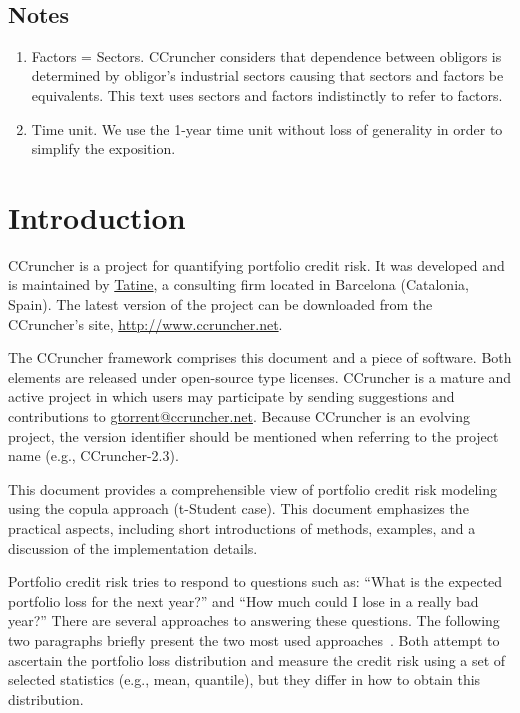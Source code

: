 \documentclass[11pt,fleqn]{book} %
\def\numversion{2.3}
\begin{document}
\glsaddall
\printglossary[style=super3colleft]
~\vfill
\section*{Notes}
\begin{enumerate}[leftmargin=*]
	\itemsep 0.5em
	\item Factors = Sectors. CCruncher considers that dependence between 
	obligors is determined by obligor's industrial sectors causing that 
	sectors and factors be equivalents. This text uses sectors and factors 
	indistinctly to refer to factors.
	\item Time unit. We use the 1-year time unit without loss of generality 
	in order to simplify the exposition.
\end{enumerate}
\cleardoublepage


\chapter{Introduction}

CCruncher is a project for quantifying portfolio credit risk. 
It was developed and is maintained by \href{http://www.tatine.es}{Tatine}, a 
consulting firm located in Barcelona (Catalonia, Spain). The latest version 
of the project can be downloaded from the CCruncher's site, 
\url{http://www.ccruncher.net}.

The CCruncher framework comprises this document and a piece of software. 
Both elements are released under open-source type licenses. 
CCruncher is a mature and active project in which users may participate by 
sending suggestions and contributions to \href{mailto:gtorrent@ccruncher.net}
{gtorrent@ccruncher.net}. Because CCruncher is an evolving project, the version
identifier should be mentioned when referring to the project name 
(e.g., CCruncher-\numversion).

This document provides a comprehensible view of portfolio credit risk modeling 
using the copula approach (t-Student case). This document emphasizes the 
practical aspects, including short introductions of methods, examples, and 
a discussion of the implementation details. 

Portfolio credit risk tries to respond to questions such as: ``What is the 
expected portfolio loss for the next year?'' and ``How much could I 
lose in a really bad year?'' There are several approaches to answering these 
questions. The following two paragraphs briefly present the two most used 
approaches~\cite{crouhy:2000}\cite[chap. 2.4]{bluhm:2002}. 
Both attempt to ascertain the portfolio loss distribution and measure 
the credit risk using a set of selected statistics (e.g., mean, quantile), 
but they differ in how to obtain this distribution. 
\end{document}
